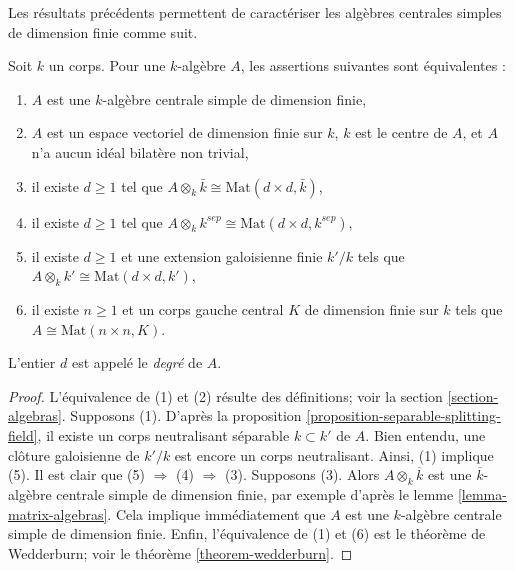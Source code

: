 \noindent
Les résultats précédents permettent de caractériser les algèbres centrales simples de dimension
finie comme suit.

\begin{lemma}
\label{lemma-finite-central-simple-algebra}
Soit $k$ un corps. Pour une $k$-algèbre $A$, les assertions suivantes sont équivalentes :
\begin{enumerate}
\item $A$ est une $k$-algèbre centrale simple de dimension finie,
\item $A$ est un espace vectoriel de dimension finie sur $k$, $k$ est le centre de $A$,
et $A$ n'a aucun idéal bilatère non trivial,
\item il existe $d \geq 1$ tel que
$A \otimes_k \bar k \cong \text{Mat}(d \times d, \bar k)$,
\item il existe $d \geq 1$ tel que
$A \otimes_k k^{sep} \cong \text{Mat}(d \times d, k^{sep})$,
\item il existe $d \geq 1$ et une extension galoisienne finie $k'/k$
tels que
$A \otimes_k k' \cong \text{Mat}(d \times d, k')$,
\item il existe $n \geq 1$ et un corps gauche central $K$ de dimension finie
sur $k$ tels que $A \cong \text{Mat}(n \times n, K)$.
\end{enumerate}
L'entier $d$ est appelé le {\it degré} de $A$.
\end{lemma}

\begin{proof}
L'équivalence de (1) et (2) résulte des définitions; voir la
section \ref{section-algebras}.
Supposons (1). D'après la
proposition \ref{proposition-separable-splitting-field},
il existe un corps neutralisant séparable $k \subset k'$ de $A$.
Bien entendu, une clôture galoisienne de $k'/k$ est encore un corps neutralisant.
Ainsi, (1) implique (5). Il est clair que (5) $\Rightarrow$ (4)
$\Rightarrow$ (3). Supposons (3). Alors $A \otimes_k \overline{k}$
est une $\overline{k}$-algèbre centrale simple de dimension finie, par exemple d'après le
lemme \ref{lemma-matrix-algebras}.
Cela implique immédiatement que $A$ est une $k$-algèbre centrale simple de dimension finie.
Enfin, l'équivalence de (1) et (6) est le théorème de Wedderburn; voir le
théorème \ref{theorem-wedderburn}.
\end{proof}
















